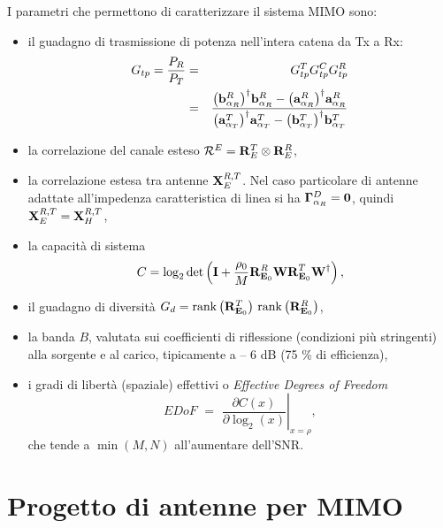\documentclass[technote]{IEEEtran}
\begin{document}
\par I parametri che permettono di caratterizzare il sistema MIMO sono:
\begin{itemize}
\item il guadagno di trasmissione di potenza nell'intera catena da Tx a Rx:
\begin{eqnarray}
{G_{tp}} = \frac{{{P_R}}}{{{P_T}}} & = & G_{tp}^TG_{tp}^CG_{tp}^R \nonumber \\
& = & \frac{{{{\left( {{\bf{b}}_{{\alpha _R}}^R} \right)}^\dagger}{\bf{b}}_{{\alpha _R}}^R - {{\left( {{\bf{a}}_{{\alpha _R}}^R} \right)}^\dagger}{\bf{a}}_{{\alpha _R}}^R}}{{{{\left( {{\bf{a}}_{{\alpha _T}}^T} \right)}^\dagger}{\bf{a}}_{{\alpha _T}}^T - {{\left( {{\bf{b}}_{{\alpha _T}}^T} \right)}^\dagger}{\bf{b}}_{{\alpha _T}}^T}} \nonumber
\end{eqnarray}
\item la correlazione del canale esteso ${\mathcal{R}^E} = {\bf{R}}_E^T \otimes {\bf{R}}_E^R$,
\item la correlazione estesa tra antenne ${\bf{X}}_E^{R,T}$. Nel caso particolare di antenne adattate all'impedenza caratteristica di linea si ha ${\bf{\Gamma }}_{{\alpha _R}}^D = {\bf{0}}$, quindi ${\bf{X}}_E^{R,T} = {\bf{X}}_H^{R,T}$,
\item la capacità  di sistema
\begin{equation}
\label{eq:capacita}
C = {\log _2}\det \left( {{\bf{I}} + \frac{{{\rho _0}}}{M}{\bf{R}}_{{{\bf{E}}_0}}^R{\bf{WR}}_{{{\bf{E}}_0}}^T{{\bf{W}}^\dagger}} \right),
\end{equation} 
\item il guadagno di diversità  ${G_d} = \mathrm{rank}\left( {{\bf{R}}_{{{\bf{E}}_0}}^T} \right)\,\mathrm{rank}\left( {{\bf{R}}_{{{\bf{E}}_0}}^R} \right)$,
\item la banda $B$, valutata sui coefficienti di riflessione (condizioni più stringenti) alla sorgente e al carico, tipicamente a – 6 dB (75 \% di efficienza),
\item i gradi di libertà (spaziale) effettivi o \textit{Effective Degrees of Freedom} $$ EDoF\,\, = \,\,{\left. {\frac{{\partial C\left( x \right)}}{{\partial {{\log }_2}\left( x \right)}}} \right|_{x = \rho }},$$ che tende a $\min \left( {M,N} \right)$ all'aumentare dell'SNR.
\end{itemize}

\section{Progetto di antenne per MIMO}
\end{document}
